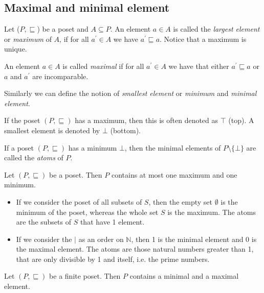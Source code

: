 \subsection{Maximal and minimal element}

\begin{definition}
    Let ($P, \sqsubseteq$) be a poset and $A \subseteq P$. An element $ a \in A $
    is called the \emph{largest element} or \emph{maximum} of $A$, if for all
    $ a^\prime \in A $ we have $ a^\prime \sqsubseteq a $. Notice that a maximum
    is unique.

    An element $ a \in A $ is called \emph{maximal} if for all $a^\prime \in A$ we
    have that either $a^\prime \sqsubseteq a$ or $a$ and $a^\prime$ are incomparable.

    Similarly we can define the notion of \emph{smallest element} or \emph{minimum}
    and \emph{minimal element}.

    If the poset $ (P, \sqsubseteq) $ has a maximum, then this is often denoted as
    $\top$ (top). A smallest element is denoted by $\bot$ (bottom).

    If a poset $ (P,\sqsubseteq) $ has a minimum $\bot$, then the
    minimal elements of $P \setminus \{\bot\}$ are called the
    \emph{atoms} of $P$.
\end{definition}

\begin{lemma}
    Let $ (P, \sqsubseteq) $ be a poset. Then $P$ contains at most one
    maximum and one minimum.
\end{lemma}

\begin{example}
    \begin{itemize}
        \item If we consider the poset of all subsets of $S$, then the
        empty set $ \emptyset $ is the minimum of the poset, whereas
        the whole set $S$ is the maximum. The atoms are the subsets
        of $S$ that have 1 element.
        \item If we consider the $\mid$ as an order on $\mathbb{N}$,
        then 1 is the minimal element and 0 is the maximal element. The
        atoms are those natural numbers greater than 1, that are only
        divisible by 1 and itself, i.e. the prime numbers.
    \end{itemize}
\end{example}

\begin{lemma}
    Let $ (P, \sqsubseteq) $ be a finite poset. Then $P$ contains a
    minimal and a maximal element.
\end{lemma}

